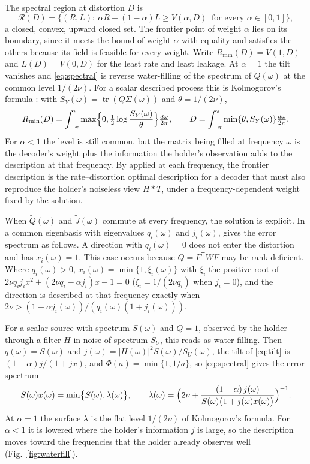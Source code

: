 \documentclass[11pt,onecolumn]{IEEEtran}
\newcommand{\tr}{\operatorname{tr}}
\newcommand{\tQ}{\tilde Q}
\newcommand{\dw}{\tfrac{d\omega}{2\pi}}
\begin{document}
The spectral region at distortion $D$ is
\begin{equation}
\mathcal R(D)=\bigl\{(R,L):\ \alpha R+(1-\alpha)L\ge V(\alpha,D)\ \text{ for every }\alpha\in[0,1]\bigr\},
\label{eq:region}
\end{equation}
a closed, convex, upward closed set. The frontier point of weight
$\alpha$ lies on its boundary, since it meets the bound of weight $\alpha$
with equality and satisfies the others because its field is feasible
for every weight. Write $R_{\min}(D)=V(1,D)$ and $L(D)=V(0,D)$ for the
least rate and least leakage. At $\alpha=1$ the tilt vanishes
and \eqref{eq:spectral} is reverse water-filling of the spectrum of
$\tQ(\omega)$ at the common level $1/(2\nu)$. For a scalar described
process this is Kolmogorov's formula
\cite{kolmogorov1956,berger1971}: with
$S_Y(\omega)=\tr(Q\Sigma(\omega))$ and $\theta=1/(2\nu)$,
\[
R_{\min}(D)=\int_{-\pi}^{\pi}\max\Bigl\{0,\tfrac12\log\frac{S_Y(\omega)}{\theta}\Bigr\}\dw,
\qquad
D=\int_{-\pi}^{\pi}\min\{\theta,S_Y(\omega)\}\dw .
\]
For $\alpha<1$ the level is still common, but the matrix being filled
at frequency $\omega$ is the decoder's weight plus the information the
holder's observation adds to the description at that frequency. By
\cite[Corollary~8]{part1} applied at each frequency, the frontier
description is the rate--distortion optimal description for a decoder
that must also reproduce the holder's noiseless view $H\ast T$, under a
frequency-dependent weight fixed by the solution.

When $\tQ(\omega)$ and $\tilde J(\omega)$ commute at every frequency, the
solution is explicit. In a common eigenbasis with eigenvalues
$q_i(\omega)$ and $j_i(\omega)$, \cite[Theorem~13]{part1} gives the
error spectrum as follows. A direction with $q_i(\omega)=0$ does not
enter the distortion and has $x_i(\omega)=1$. This case occurs because
$Q=F^{\mathsf T}WF$ may be rank deficient. Where $q_i(\omega)>0$,
$x_i(\omega)=\min\{1,\xi_i(\omega)\}$ with $\xi_i$ the positive root of
$2\nu q_ij_ix^2+(2\nu q_i-\alpha j_i)x-1=0$
($\xi_i=1/(2\nu q_i)$ when $j_i=0$), and the direction is described at
that frequency exactly when
$2\nu>(1+\alpha j_i(\omega))/(q_i(\omega)(1+j_i(\omega)))$.

For a scalar source with spectrum $S(\omega)$ and $Q=1$, observed by the
holder through a filter $H$ in noise of spectrum $S_U$, this reads as
water-filling. Then $q(\omega)=S(\omega)$ and
$j(\omega)=|H(\omega)|^2S(\omega)/S_U(\omega)$, the tilt of
\eqref{eq:tilt} is $(1-\alpha)j/(1+jx)$, and $\Phi(a)=\min\{1,1/a\}$, so
\eqref{eq:spectral} gives the error spectrum
\begin{equation}
S(\omega)x(\omega)=\min\bigl\{S(\omega),\lambda(\omega)\bigr\},\qquad
\lambda(\omega)=\Bigl(2\nu+\frac{(1-\alpha)\,j(\omega)}{S(\omega)\bigl(1+j(\omega)x(\omega)\bigr)}\Bigr)^{-1}.
\label{eq:surface}
\end{equation}
At $\alpha=1$ the surface $\lambda$ is the flat level $1/(2\nu)$ of
Kolmogorov's formula. For $\alpha<1$ it is lowered where the holder's
information $j$ is large, so the description moves toward the
frequencies that the holder already observes well (Fig.~\ref{fig:waterfill}).
\end{document}
